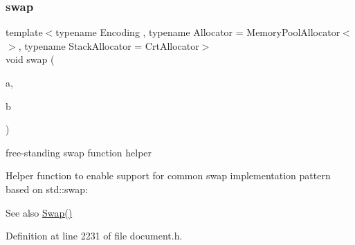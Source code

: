 \subsubsection{\texorpdfstring{swap}{swap}}
{\footnotesize\ttfamily template$<$typename Encoding , typename Allocator  = Memory\+Pool\+Allocator$<$$>$, typename Stack\+Allocator  = Crt\+Allocator$>$ \\
void swap (\begin{DoxyParamCaption}\item[{\mbox{\hyperlink{classrapidjson_1_1_generic_document}{Generic\+Document}}$<$ \mbox{\hyperlink{classrapidjson_1_1_encoding}{Encoding}}, \mbox{\hyperlink{classrapidjson_1_1_allocator}{Allocator}}, Stack\+Allocator $>$ \&}]{a,  }\item[{\mbox{\hyperlink{classrapidjson_1_1_generic_document}{Generic\+Document}}$<$ \mbox{\hyperlink{classrapidjson_1_1_encoding}{Encoding}}, \mbox{\hyperlink{classrapidjson_1_1_allocator}{Allocator}}, Stack\+Allocator $>$ \&}]{b }\end{DoxyParamCaption})\hspace{0.3cm}{\ttfamily [friend]}}



free-\/standing swap function helper 

Helper function to enable support for common swap implementation pattern based on {\ttfamily std\+::swap\+:} 
\begin{DoxyCode}{0}
\DoxyCodeLine{    \textcolor{comment}{// ...}}
\DoxyCodeLine{\}}
\end{DoxyCode}
 \begin{DoxySeeAlso}{See also}
\mbox{\hyperlink{classrapidjson_1_1_generic_document_abf1cbab989b856f9d260787b2575750b}{Swap()}} 
\end{DoxySeeAlso}


Definition at line 2231 of file document.\+h.


\begin{DoxyCode}{0}

\end{DoxyCode}


